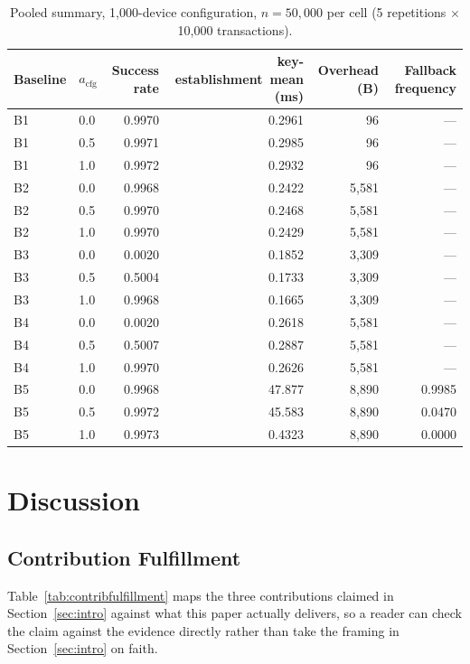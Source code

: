 \documentclass[journal]{IEEEtran}
\newcommand{\keyest}{key-establishment}
\newcommand{\acfg}{\ensuremath{a_{\text{cfg}}}}
\begin{document}
\begin{table}[t]
\centering
\caption{Pooled summary, 1{,}000-device configuration, $n=50{,}000$ per cell (5 repetitions $\times$ 10{,}000 transactions).}
\label{tab:summary}
\small
\begin{tabular}{@{}llrrrr@{}}
\toprule
Baseline & $\acfg$ & Success rate & \keyest\ mean (ms) & Overhead (B) & Fallback frequency \\
\midrule
B1 & 0.0 & 0.9970 & 0.2961 & 96 & --- \\
B1 & 0.5 & 0.9971 & 0.2985 & 96 & --- \\
B1 & 1.0 & 0.9972 & 0.2932 & 96 & --- \\
B2 & 0.0 & 0.9968 & 0.2422 & 5{,}581 & --- \\
B2 & 0.5 & 0.9970 & 0.2468 & 5{,}581 & --- \\
B2 & 1.0 & 0.9970 & 0.2429 & 5{,}581 & --- \\
B3 & 0.0 & 0.0020 & 0.1852 & 3{,}309 & --- \\
B3 & 0.5 & 0.5004 & 0.1733 & 3{,}309 & --- \\
B3 & 1.0 & 0.9968 & 0.1665 & 3{,}309 & --- \\
B4 & 0.0 & 0.0020 & 0.2618 & 5{,}581 & --- \\
B4 & 0.5 & 0.5007 & 0.2887 & 5{,}581 & --- \\
B4 & 1.0 & 0.9970 & 0.2626 & 5{,}581 & --- \\
B5 & 0.0 & 0.9968 & 47.877 & 8{,}890 & 0.9985 \\
B5 & 0.5 & 0.9972 & 45.583 & 8{,}890 & 0.0470 \\
B5 & 1.0 & 0.9973 & 0.4323 & 8{,}890 & 0.0000 \\
\bottomrule
\end{tabular}
\end{table}

\section{Discussion}
\label{sec:discussion}

\subsection{Contribution Fulfillment}

Table~\ref{tab:contribfulfillment} maps the three contributions claimed in Section~\ref{sec:intro} against what this paper actually delivers, so a reader can check the claim against the evidence directly rather than take the framing in Section~\ref{sec:intro} on faith.
\end{document}
